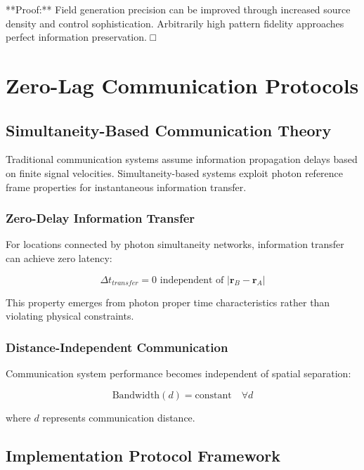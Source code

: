 \documentclass[12pt,a4paper]{article}
\begin{document}
**Proof:** Field generation precision can be improved through increased source density and control sophistication. Arbitrarily high pattern fidelity approaches perfect information preservation. □

\section{Zero-Lag Communication Protocols}

\subsection{Simultaneity-Based Communication Theory}

Traditional communication systems assume information propagation delays based on finite signal velocities. Simultaneity-based systems exploit photon reference frame properties for instantaneous information transfer.

\subsubsection{Zero-Delay Information Transfer}

For locations connected by photon simultaneity networks, information transfer can achieve zero latency:

\begin{equation}
\Delta t_{transfer} = 0 \text{ independent of } |\mathbf{r}_B - \mathbf{r}_A|
\label{eq:zero_delay_transfer}
\end{equation}

This property emerges from photon proper time characteristics rather than violating physical constraints.

\subsubsection{Distance-Independent Communication}

Communication system performance becomes independent of spatial separation:

\begin{equation}
\text{Bandwidth}(d) = \text{constant} \quad \forall d
\label{eq:distance_independent_bandwidth}
\end{equation}

where $d$ represents communication distance.

\subsection{Implementation Protocol Framework}
\end{document}
